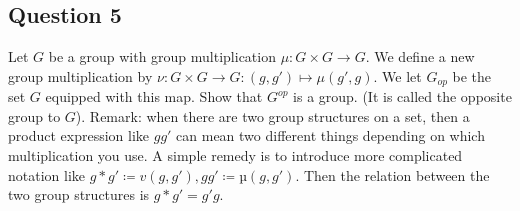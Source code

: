 \subsection{Question 5}
Let \( G \) be a group with group multiplication \( \mu : G \times  G \to  G\). We define a 
new group multiplication by \( \nu : G \times G \to G : \left( g,g' \right) \mapsto \mu \left( g', g \right)\). We let \( G_{op} \) be the set \( G \) equipped with this map.
Show that \( G^{op}  \) is a group. (It is called the opposite group to \( G \)). Remark:
when there are two group structures on a set, then a product expression like \( gg'  \) can mean two
different things depending on which multiplication you use. A simple remedy is to introduce
more complicated notation like \( g  *  g' \coloneqq  v(g, g' ), gg' \coloneqq  µ(g, g' ) \). Then the relation between the
two group structures is \( g * g'  = g' g \).

\begin{solution}
  
\end{solution}

